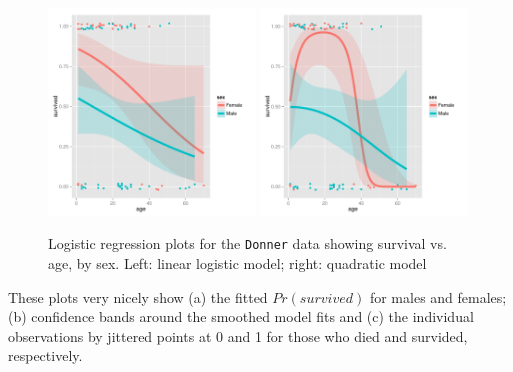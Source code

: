 \documentclass[10pt,twoside]{article}\usepackage[]{graphicx}\usepackage[]{color}
\newcommand{\data}[1]{\texttt{#1}}
\begin{document}
\begin{figure}[htb]
\begin{center}




\includegraphics[width=0.49\textwidth]{fig/vcd-tut-donner3a}
\includegraphics[width=0.49\textwidth]{fig/vcd-tut-donner3b}
\caption{Logistic regression plots for the  \data{Donner} data
	showing survival vs. age, by sex. Left: linear logistic model; right: quadratic model}
\label{fig:donner3}
\end{center}
\end{figure}
These plots very nicely show (a) the fitted $Pr(survived)$ for males and females;
(b) confidence bands around the smoothed model fits and (c) the individual
observations by jittered points at 0 and 1 for those who died and survided, respectively.


\end{document}
